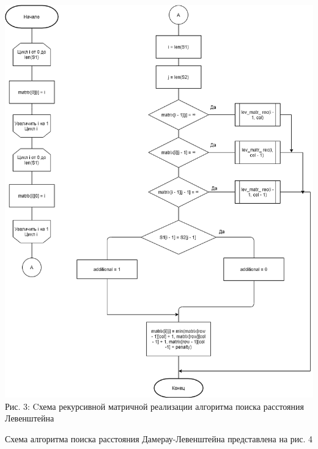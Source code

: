 \documentclass[12pt,a4paper]{article}
\begin{document}
\begin{center}
	\includegraphics[width=1\linewidth]{lev_matr_rec}\\
	Рис. 3: Cхема рекурсивной матричной реализации алгоритма поиска расстояния Левенштейна
\end{center}
\clearpage
Схема алгоритма поиска расстояния Дамерау-Левенштейна представлена на рис. 4
\end{document}
